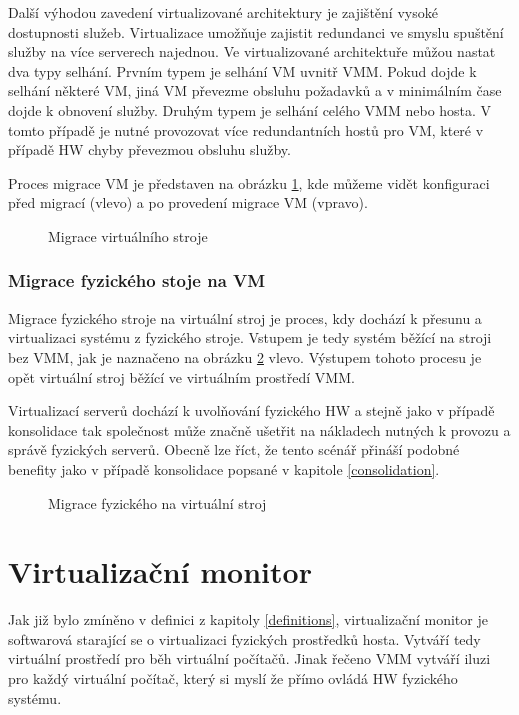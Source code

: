 Další výhodou zavedení virtualizované architektury je zajištění vysoké dostupnosti služeb. Virtualizace umožňuje zajistit redundanci ve smyslu spuštění služby na více serverech najednou. Ve virtualizované architektuře můžou
nastat dva typy selhání. Prvním typem je selhání VM uvnitř VMM. Pokud dojde k selhání některé VM, jiná VM převezme obsluhu požadavků a v minimálním čase dojde k obnovení služby. Druhým typem je selhání celého VMM nebo hosta.
V tomto případě je nutné provozovat více redundantních hostů pro VM, které v případě HW chyby převezmou obsluhu služby.

Proces migrace VM je představen na obrázku \ref{migration1}, kde můžeme vidět konfiguraci před migrací (vlevo) a po provedení migrace VM (vpravo).

\begin{figure}
    \centering    
    \caption{Migrace virtuálního stroje}
    \label{migration1}
\end{figure}

\subsubsection*{Migrace fyzického stoje na VM}

Migrace fyzického stroje na virtuální stroj je proces, kdy dochází k přesunu a virtualizaci systému z fyzického stroje. Vstupem je tedy systém běžící na stroji bez VMM, jak je naznačeno na obrázku \ref{migration2} vlevo. 
Výstupem tohoto procesu je opět virtuální stroj běžící ve virtuálním prostředí VMM.

Virtualizací serverů dochází k uvolňování fyzického HW a stejně jako v případě konsolidace tak společnost může značně ušetřit na nákladech nutných k provozu a správě fyzických serverů. Obecně lze říct, že tento scénář přináší 
podobné benefity jako v případě konsolidace popsané v kapitole \ref{consolidation}.

\begin{figure}
    \centering    
    \caption{Migrace fyzického na virtuální stroj}
    \label{migration2}
\end{figure}

\section{Virtualizační monitor}
\label{section:vmm}

Jak již bylo zmíněno v definici z kapitoly \ref{definitions}, virtualizační monitor je softwarová starající se o virtualizaci fyzických prostředků hosta. Vytváří tedy virtuální prostředí pro běh virtuální počítačů.
Jinak řečeno VMM vytváří iluzi pro každý virtuální počítač, který si myslí že přímo ovládá HW fyzického systému.

